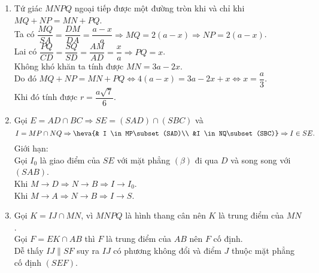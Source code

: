 \begin{bt}
{\begin{enumerate}
{}
\item Tứ giác $MNPQ$ ngoại tiếp được một đường tròn khi và chỉ khi $MQ+NP=MN+PQ$.\\
Ta có $\dfrac{MQ}{SA}=\dfrac{DM}{DA}=\dfrac{a-x}{a} \Rightarrow MQ=2(a-x) \Rightarrow NP=2(a-x)$.\\
Lai có $\dfrac{PQ}{CD}=\dfrac{SQ}{SD}=\dfrac{AM}{AD}=\dfrac{x}{a} \Rightarrow PQ=x$.\\
Không khó khăn ta tính được $MN=3a-2x$.\\
Do đó $MQ+NP=MN+PQ \Leftrightarrow 4(a-x)=3a-2x+x \Leftrightarrow x=\dfrac{a}{3}$.\\
Khi đó tính được $r=\dfrac{a\sqrt{7}}{6}$.
\item Gọi $E=AD\cap BC \Rightarrow SE=(SAD)\cap (SBC)$ và
$$I=MP\cap NQ \Rightarrow\heva{& 
I \in MP\subset (SAD)\\ &I \in NQ\subset (SBC)} \Rightarrow I \in SE.
$$
Giới hạn:\\
Gọi $I_0$ là giao điểm của $SE$ với mặt phẳng $(\beta)$ đi qua $D$ và song song với $(SAB)$.\\
Khi $M \to D \Rightarrow N \to B \Rightarrow I \to I_0$.\\
Khi $M \to A \Rightarrow N \to B \Rightarrow I \to S$.
\item Gọi $K=IJ\cap MN$, vì $MNPQ$ là hình thang cân nên $K$ là trung điểm của $MN$.\\ Gọi $F=EK\cap AB$ thì $F$ là trung điểm của $AB$ nên $F$ cố định.\\
Dễ thấy $IJ\parallel SF$ suy ra $IJ$ có phương không đổi và điểm $J$ thuộc mặt phẳng cố định $(SEF)$.
\end{enumerate}
}
\end{bt}

